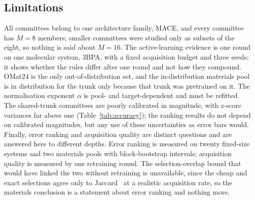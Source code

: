 \subsection{Limitations}

All committees belong to one architecture family, MACE, and every committee has
$M=8$ members; smaller committees were studied only as subsets of the eight, so
nothing is said about $M=16$. The active-learning evidence is one round on one
molecular system, 3BPA, with a fixed acquisition budget and three seeds; it
shows whether the rules differ after one round and not how they compound.
OMat24 is the only out-of-distribution set, and the in-distribution materials
pool is in distribution for the trunk only because that trunk was pretrained on
it. The normalisation exponent $\alpha$ is pool- and target-dependent and must
be refitted. The shared-trunk committees are poorly calibrated in magnitude,
with z-score variances far above one (Table~\ref{tab:accuracy}); the ranking
results do not depend on calibrated magnitudes, but any use of these
uncertainties as error bars would. Finally, error ranking and acquisition
quality are distinct questions and are answered here to different depths. Error
ranking is measured on twenty fixed-size systems and two materials pools with
block-bootstrap intervals; acquisition quality is measured by one retraining
round. The selection-overlap bound that would have linked the two without
retraining is unavailable, since the cheap and exact selections agree only to
Jaccard \fsMPtrajJaccard\ at a realistic acquisition rate, so the materials
conclusion is a statement about error ranking and nothing more.
